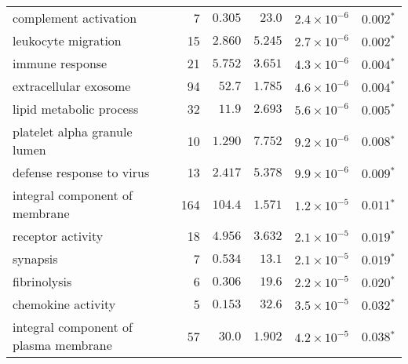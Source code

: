 \begin{longtable}{|l|r|r|r|r|r|}
                             complement activation &                       7 &                $ 0.305$ &   $  23.0$ &  $2.4\times 10^{-6}$ &             $\bm{ 0.002{^*}}$ \\
                               leukocyte migration &                      15 &                $ 2.860$ &   $ 5.245$ &  $2.7\times 10^{-6}$ &             $\bm{ 0.002{^*}}$ \\
                                   immune response &                      21 &                $ 5.752$ &   $ 3.651$ &  $4.3\times 10^{-6}$ &             $\bm{ 0.004{^*}}$ \\
                             extracellular exosome &                      94 &                $  52.7$ &   $ 1.785$ &  $4.6\times 10^{-6}$ &             $\bm{ 0.004{^*}}$ \\
                           lipid metabolic process &                      32 &                $  11.9$ &   $ 2.693$ &  $5.6\times 10^{-6}$ &             $\bm{ 0.005{^*}}$ \\
                      platelet alpha granule lumen &                      10 &                $ 1.290$ &   $ 7.752$ &  $9.2\times 10^{-6}$ &             $\bm{ 0.008{^*}}$ \\
                         defense response to virus &                      13 &                $ 2.417$ &   $ 5.378$ &  $9.9\times 10^{-6}$ &             $\bm{ 0.009{^*}}$ \\
                    integral component of membrane &                     164 &                $ 104.4$ &   $ 1.571$ &  $1.2\times 10^{-5}$ &             $\bm{ 0.011{^*}}$ \\
                                 receptor activity &                      18 &                $ 4.956$ &   $ 3.632$ &  $2.1\times 10^{-5}$ &             $\bm{ 0.019{^*}}$ \\
                                          synapsis &                       7 &                $ 0.534$ &   $  13.1$ &  $2.1\times 10^{-5}$ &             $\bm{ 0.019{^*}}$ \\
                                      fibrinolysis &                       6 &                $ 0.306$ &   $  19.6$ &  $2.2\times 10^{-5}$ &             $\bm{ 0.020{^*}}$ \\
                                chemokine activity &                       5 &                $ 0.153$ &   $  32.6$ &  $3.5\times 10^{-5}$ &             $\bm{ 0.032{^*}}$ \\
             integral component of plasma membrane &                      57 &                $  30.0$ &   $ 1.902$ &  $4.2\times 10^{-5}$ &             $\bm{ 0.038{^*}}$ \\

\end{longtable}
